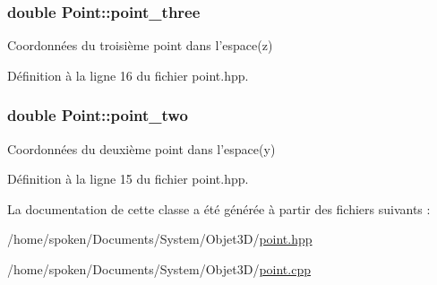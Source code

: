\hypertarget{class_point_af7cb3c4c0c0f52218ac9ce180df003da}{
\subsubsection[{point\-\_\-three}]{\setlength{\rightskip}{0pt plus 5cm}double Point\-::point\-\_\-three\hspace{0.3cm}{\ttfamily [private]}}}\label{class_point_af7cb3c4c0c0f52218ac9ce180df003da}
Coordonnées du troisième point dans l'espace(z) 

Définition à la ligne 16 du fichier point.\-hpp.

\hypertarget{class_point_a7eece7f7413a741137cf32bb763f3987}{
\subsubsection[{point\-\_\-two}]{\setlength{\rightskip}{0pt plus 5cm}double Point\-::point\-\_\-two\hspace{0.3cm}{\ttfamily [private]}}}\label{class_point_a7eece7f7413a741137cf32bb763f3987}
Coordonnées du deuxième point dans l'espace(y) 

Définition à la ligne 15 du fichier point.\-hpp.



La documentation de cette classe a été générée à partir des fichiers suivants \-:\begin{DoxyCompactItemize}
\item 
/home/spoken/\-Documents/\-System/\-Objet3\-D/\hyperlink{point_8hpp}{point.\-hpp}\item 
/home/spoken/\-Documents/\-System/\-Objet3\-D/\hyperlink{point_8cpp}{point.\-cpp}\end{DoxyCompactItemize}

